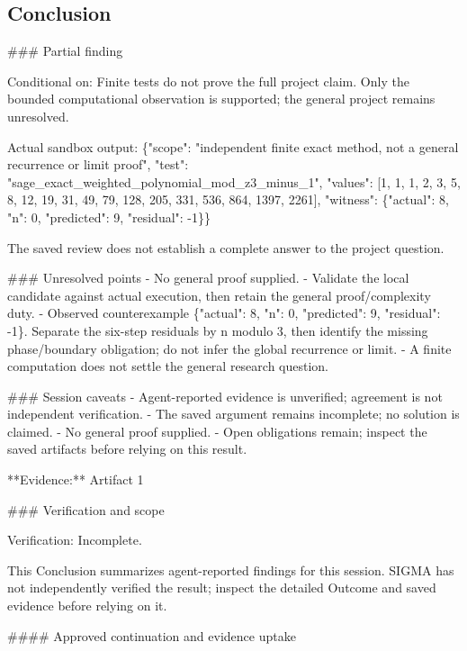 \documentclass[11pt]{article}
\begin{document}
\subsection{Conclusion}
\#\#\# Partial finding

Conditional on: Finite tests do not prove the full project claim. Only the bounded computational observation is supported; the general project remains unresolved.

Actual sandbox output: \{"scope": "independent finite exact method, not a general recurrence or limit proof", "test": "sage\_exact\_weighted\_polynomial\_mod\_z3\_minus\_1", "values": [1, 1, 1, 2, 3, 5, 8, 12, 19, 31, 49, 79, 128, 205, 331, 536, 864, 1397, 2261], "witness": \{"actual": 8, "n": 0, "predicted": 9, "residual": -1\}\}

The saved review does not establish a complete answer to the project question.

\#\#\# Unresolved points
- No general proof supplied.
- Validate the local candidate against actual execution, then retain the general proof/complexity duty.
- Observed counterexample \{"actual": 8, "n": 0, "predicted": 9, "residual": -1\}. Separate the six-step residuals by n modulo 3, then identify the missing phase/boundary obligation; do not infer the global recurrence or limit.
- A finite computation does not settle the general research question.

\#\#\# Session caveats
- Agent-reported evidence is unverified; agreement is not independent verification.
- The saved argument remains incomplete; no solution is claimed.
- No general proof supplied.
- Open obligations remain; inspect the saved artifacts before relying on this result.

**Evidence:** Artifact 1

\#\#\# Verification and scope

Verification: Incomplete.

This Conclusion summarizes agent-reported findings for this session. SIGMA has not independently verified the result; inspect the detailed Outcome and saved evidence before relying on it.

\#\#\#\# Approved continuation and evidence uptake
\end{document}

